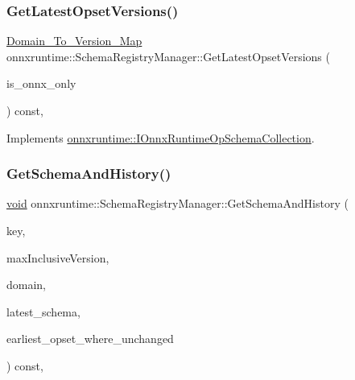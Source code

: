 \subsubsection{\texorpdfstring{Get\+Latest\+Opset\+Versions()}{GetLatestOpsetVersions()}}
{\footnotesize\ttfamily \mbox{\hyperlink{namespaceonnxruntime_ab773a024322804641f5eb4964e3471d6}{Domain\+\_\+\+To\+\_\+\+Version\+\_\+\+Map}} onnxruntime\+::\+Schema\+Registry\+Manager\+::\+Get\+Latest\+Opset\+Versions (\begin{DoxyParamCaption}\item[{bool}]{is\+\_\+onnx\+\_\+only }\end{DoxyParamCaption}) const\hspace{0.3cm}{\ttfamily [override]}, {\ttfamily [virtual]}}



Implements \mbox{\hyperlink{classonnxruntime_1_1IOnnxRuntimeOpSchemaCollection_aba4c47f6650781c1ad22d6e61d09b729}{onnxruntime\+::\+I\+Onnx\+Runtime\+Op\+Schema\+Collection}}.

\mbox{\label{classonnxruntime_1_1SchemaRegistryManager_ae323ccc55079bbb8b6fedfd382ec2d30}} 
\subsubsection{\texorpdfstring{Get\+Schema\+And\+History()}{GetSchemaAndHistory()}}
{\footnotesize\ttfamily \mbox{\hyperlink{mlasi_8h_a88f941d423cb2a819b70a1358982b1a6}{void}} onnxruntime\+::\+Schema\+Registry\+Manager\+::\+Get\+Schema\+And\+History (\begin{DoxyParamCaption}\item[{const std\+::string \&}]{key,  }\item[{const int}]{max\+Inclusive\+Version,  }\item[{const std\+::string \&}]{domain,  }\item[{const O\+N\+N\+X\+\_\+\+N\+A\+M\+E\+S\+P\+A\+C\+E\+::\+Op\+Schema $\ast$$\ast$}]{latest\+\_\+schema,  }\item[{int $\ast$}]{earliest\+\_\+opset\+\_\+where\+\_\+unchanged }\end{DoxyParamCaption}) const\hspace{0.3cm}{\ttfamily [override]}, {\ttfamily [virtual]}}



